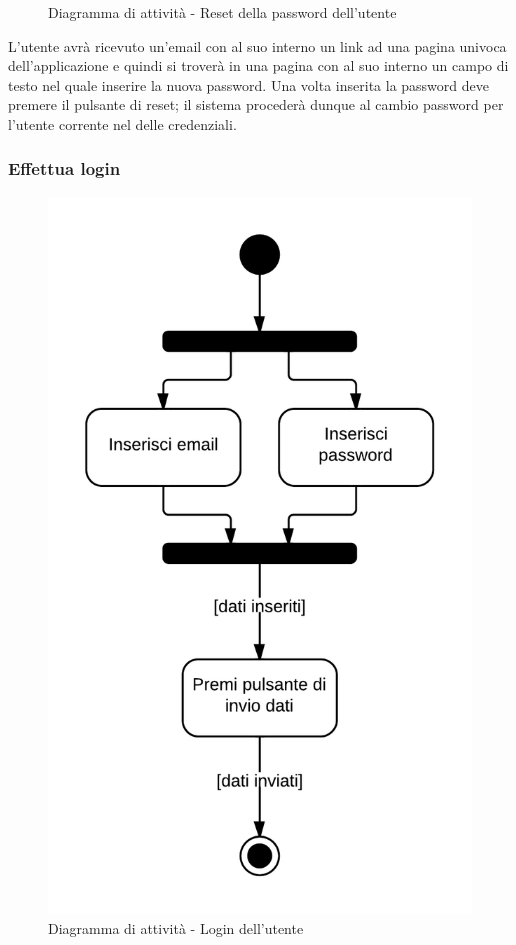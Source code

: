 \begin{figure}[H]
\caption{Diagramma di attività - Reset della password dell'utente}
\end{figure}

L'utente avrà ricevuto un'email con al suo interno un link ad una pagina univoca dell'applicazione  e quindi si troverà in una pagina con al suo interno un campo di testo nel quale inserire la nuova password. Una volta inserita la password deve premere il pulsante di reset; il sistema  procederà dunque al cambio password per l'utente corrente nel  delle credenziali.

\subsubsection{Effettua login}

\begin{figure}[H]
\centering
\includegraphics[scale=0.2]{uml/MaaP - Effettua login.png}
\caption{Diagramma di attività - Login dell'utente}
\end{figure}

